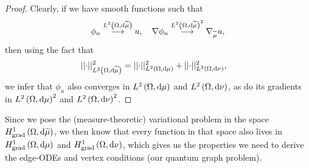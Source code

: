 \begin{proof}
	Clearly, if we have smooth functions such that
	\begin{align*}
		\phi_n \overset{L^{2}\left( \Omega,\mathrm{d}\widetilde{\mu} \right)}{\longrightarrow} u, \quad \nabla\phi_n\overset{L^{2}\left( \Omega,\mathrm{d}\widetilde{\mu} \right)^2}{\longrightarrow}\nabla_{\widetilde{\mu}}u,
	\end{align*}
	then using the fact that
	\begin{align*}
		\lvert\lvert \cdot \rvert\rvert_{L^{2}\left( \Omega,\mathrm{d}\widetilde{\mu} \right)}^2 &= \lvert\lvert \cdot \rvert\rvert_{L^{2}\left( \Omega,\mathrm{d}\mu \right)}^2 + \lvert\lvert \cdot \rvert\rvert_{L^{2}\left( \Omega,\mathrm{d}\nu \right)}^2,
	\end{align*}
	we infer that $\phi_n$ also converges in $L^{2}\left( \Omega,\mathrm{d}\mu \right)$ and $L^{2}\left( \Omega,\mathrm{d}\nu \right)$, as do its gradients in $L^{2}\left( \Omega,\mathrm{d}\mu \right)^2$ and $L^{2}\left( \Omega,\mathrm{d}\nu \right)^2$.
\end{proof}
Since we pose the (measure-theoretic) variational problem in the space $H^1_\mathrm{grad}\left( \Omega, \mathrm{d}\widetilde{\mu} \right)$, we then know that every function in that space also lives in $H^1_\mathrm{grad}\left( \Omega, \mathrm{d}\mu \right)$ and $H^1_\mathrm{grad}\left( \Omega, \mathrm{d}\nu \right)$, which gives us the properties we need to derive the edge-ODEs and vertex conditions (our quantum graph problem).